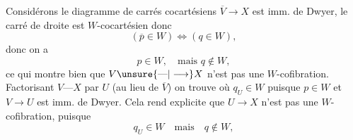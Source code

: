 
Considérons  le diagramme de carrés cocartésiens
 $\overline V\longrightarrow X$ est imm.  de Dwyer,  le carré de droite est $W$-cocartésien donc 
\[
(\overline p\in W)\Longleftrightarrow(q\in W),
\]
donc  on a 
\[
p\in W,\quad\text{mais }q\notin W,
\]
ce qui montre bien que $V\unsure{\text{---}|\longrightarrow}X$ n’est pas une $W$-cofibration. Factorisant $V\text{---}X$ par $U$ (au lieu de $\overline V$) on trouve
où $q_U\in W$ puisque $p\in W$ et $V\longrightarrow U$ est imm. de Dwyer. Cela rend explicite que $U\longrightarrow X$ n’est pas une $W$-cofibration, puisque
\[
q_U\in W\quad\text{mais}\quad q\notin W,
\]
\hfill {}

